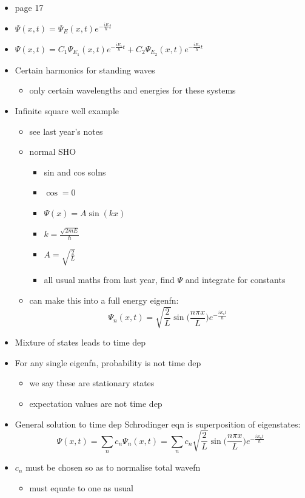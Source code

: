 \documentclass[a4paper,11pt,normalem]{article}
\begin{document}
\begin{itemize}
\item
  page 17
\item
  \(\Psi(x,t) = \Psi_{E}(x,t)e^{-\frac{iE}{\hbar}t}\)
\item
  \(\Psi(x,t) = C_{1}\Psi_{E_{1}}(x,t)e^{-\frac{iE_{1}}{\hbar}t} + C_{2}\Psi_{E_{2}}(x,t)e^{-\frac{iE_{2}}{\hbar}t}\)
\item
  Certain harmonics for standing waves
  \begin{itemize}
  \item
    only certain wavelengths and energies for these systems
  \end{itemize}
\item
  Infinite square well example
  \begin{itemize}
  \item
    see last year's notes
  \item
    normal SHO
    \begin{itemize}
    \item
      sin and cos solns
    \item
      \(\cos = 0\)
    \item
      \(\Psi(x) = A\sin(kx)\)
    \item
      \(k = \frac{\sqrt{2mE}}{\hbar}\)
    \item
      \(A = \sqrt{\frac{2}{L}}\)
    \item
      all usual maths from last year, find \(\Psi\) and integrate for
      constants
    \end{itemize}
  \item
    can make this into a full energy eigenfn: \[
    \Psi_{n}(x,t) = \sqrt{\frac{2}{L}}\sin\Big(\frac{n\pi x}{L}\Big)e^{-\frac{iE_{n}t}{\hbar}}
    \]
  \end{itemize}
\item
  Mixture of states leads to time dep
\item
  For any single eigenfn, probability is not time dep
  \begin{itemize}
  \item
    we say these are stationary states
  \item
    expectation values are not time dep
  \end{itemize}
\item
  General solution to time dep Schrodinger eqn is superposition of
  eigenstates: \[
  \Psi(x,t) = \sum_{n} c_{n}\Psi_{n}(x,t) = \sum_{n}c_{n}\sqrt{\frac{2}{L}}\sin\Big(\frac{n\pi x}{L}\Big)e^{-\frac{iE_{n}t}{\hbar}}
  \]
\item
  \(c_{n}\) must be chosen so as to normalise total wavefn
  \begin{itemize}
  \item
    must equate to one as usual
  \end{itemize}
\end{itemize}
\end{document}

